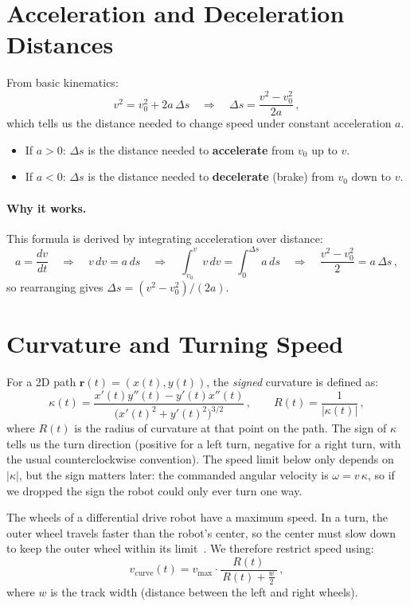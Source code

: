 \documentclass[11pt]{article}
\begin{document}
\section{Acceleration and Deceleration Distances}
\label{sec:kinematics}

From basic kinematics:
\[
v^2 = v_0^2 + 2a\,\Delta s
\quad\Longrightarrow\quad
\Delta s = \frac{v^2 - v_0^2}{2a}\,,
\] 
which tells us the distance needed to change speed under constant acceleration $a$. 

\begin{itemize}
  \item If \(a > 0\): \(\Delta s\) is the distance needed to \textbf{accelerate} from \(v_0\) up to \(v\).
  \item If \(a < 0\): \(\Delta s\) is the distance needed to \textbf{decelerate} (brake) from \(v_0\) down to \(v\).
\end{itemize}

\paragraph{Why it works.} This formula is derived by integrating acceleration over distance:
\[
a = \frac{dv}{dt}
\quad\Rightarrow\quad
v\,dv = a\,ds
\quad\Rightarrow\quad
\int_{v_0}^{v} v\,dv = \int_{0}^{\Delta s} a\,ds
\quad\Rightarrow\quad
\frac{v^2 - v_0^2}{2} = a\,\Delta s\,,
\] 
so rearranging gives $\Delta s = (v^2 - v_0^2)/(2a)$.

\section{Curvature and Turning Speed}

For a 2D path \(\mathbf{r}(t) = (x(t), y(t))\), the \emph{signed} curvature is defined as:
\[
\kappa(t)
= \frac{x'(t)y''(t) - y'(t)x''(t)}
       {\big(x'(t)^2 + y'(t)^2\big)^{3/2}}\,,
\qquad
R(t) = \frac{1}{|\kappa(t)|}\,,
\]
where \(R(t)\) is the radius of curvature at that point on the path. The sign of \(\kappa\) tells us the turn direction (positive for a left turn, negative for a right turn, with the usual counterclockwise convention). The speed limit below only depends on \(|\kappa|\), but the sign matters later: the commanded angular velocity is \(\omega = v\,\kappa\), so if we dropped the sign the robot could only ever turn one way.

The wheels of a differential drive robot have a maximum speed. In a turn, the outer wheel travels faster than the robot's center, so the center must slow down to keep the outer wheel within its limit~\cite{lavalle,wpilib}. We therefore restrict speed using:
\[
v_{\text{curve}}(t)
= v_{\max} \cdot \frac{R(t)}{\,R(t) + \tfrac{w}{2}\,}\,,
\]
where \(w\) is the track width (distance between the left and right wheels).
\end{document}
